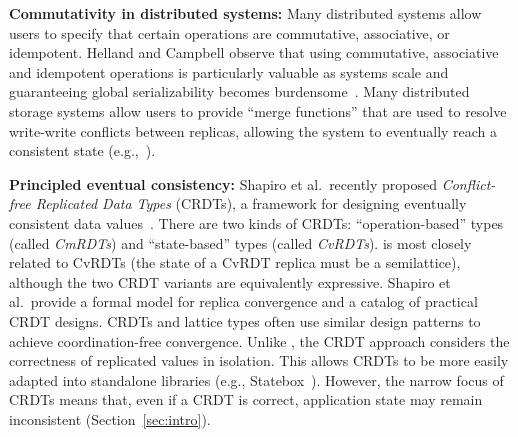 \vspace{0.5em}\noindent
\textbf{Commutativity in distributed systems:} Many distributed systems allow
users to specify that certain operations are commutative, associative, or
idempotent. Helland and Campbell observe that using commutative, associative and
idempotent operations is particularly valuable as systems scale and guaranteeing
global serializability becomes burdensome~\cite{Helland2009}. Many
distributed storage systems allow users to provide ``merge functions'' that are
used to resolve write-write conflicts between replicas, allowing the system to
eventually reach a consistent state
(e.g.,~\cite{DeCandia2007,statebox,Lloyd2011,Reiher1994,Terry1995}).%



\vspace{0.5em}\noindent
\textbf{Principled eventual consistency:} Shapiro et al.\ recently proposed
\emph{Conflict-free Replicated Data Types} (CRDTs), a framework for designing
eventually consistent data values~\cite{Shapiro2011a,Shapiro2011b}. There are
two kinds of CRDTs: ``operation-based'' types (called \emph{CmRDTs}) and
``state-based'' types (called \emph{CvRDTs}). \lang is most closely related to
CvRDTs (the state of a CvRDT replica must be a semilattice), although the two
CRDT variants are equivalently expressive. Shapiro et al.\ provide a formal
model for replica convergence and a catalog of practical CRDT designs. CRDTs and
\lang lattice types often use similar design patterns to achieve
coordination-free convergence. Unlike \lang, the CRDT approach considers the
correctness of replicated values in isolation. This allows CRDTs to be more
easily adapted into standalone libraries (e.g.,
Statebox~\cite{statebox}). However, the narrow focus of CRDTs means that, even
if a CRDT is correct, application state may remain inconsistent
(Section~\ref{sec:intro}).

